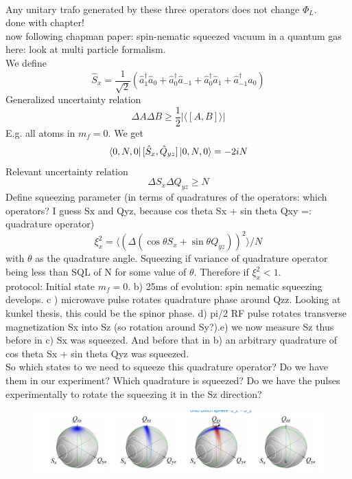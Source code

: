 \\
Any unitary trafo generated by these three operators does not change $\Phi_L$.
\\
done with chapter!
\\
now following chapman paper: spin-nematic squeezed vacuum in a quantum gas
\\
here: look at multi particle formalism.
\\
We define
\begin{equation}
	\hat{S}_x = \frac{1}{\sqrt{2}}( \hat{a}_1^\dag \hat{a}_0 + \hat{a}_0^\dag \hat{a}_{-1} + \hat{a}_0^\dag \hat{a}_1 + \hat{a}_{-1}^\dag \hat{a}_0)
\end{equation}
Generalized uncertainty relation
\begin{equation}
	\Delta A \Delta B \geq \frac{1}{2} |\langle [A,B] \rangle |
\end{equation}
E.g. all atoms in $m_f = 0$. We get 
\begin{equation}
	\bra{0,N,0} [\hat{S}_x , \hat{Q}_{yz} ] \ket{0,N,0} = - 2iN
\end{equation}
Relevant uncertainty relation
\begin{equation}
	\Delta S_x \Delta Q_{yz} \geq N
\end{equation}
Define squeezing parameter (in terms of quadratures of the operators: which operators? I guess Sx and Qyz, because cos theta Sx + sin theta Qxy =: quadrature operator)
\begin{equation}
	\xi_{x}^2 = \langle ( \Delta (\cos \theta S_{x} + \sin \theta Q_{yz}))^2 \rangle /N
\end{equation}
with $\theta$ as the quadrature angle. Squeezing if variance of quadrature operator being less than SQL of N for some value of $\theta$. 
Therefore if $\xi_x^2 < 1$.
\\
protocol: Initial state $m_f = 0$. b) 25ms of evolution: spin nematic squeezing develops. c ) microwave pulse rotates quadrature phase around Qzz. Looking at kunkel thesis, this could be the spinor phase.  d) pi/2 RF pulse rotates transverse magnetization Sx into Sz (so rotation around Sy?).e) we now measure Sz thus before in c) Sx was squeezed. And before that in b) an arbitrary quadrature of cos theta Sx + sin theta Qyz was squeezed. 
\\
So which states to we need to squeeze this quadrature operator? Do we have them in our experiment? Which quadrature is squeezed? Do we have the pulses experimentally to rotate the squeezing it in the Sz direction?
\begin{figure}
	\centering
	\includegraphics[width=0.7\linewidth]{chapman_fig1}
	\caption{}
	\label{fig:chapmanfig1}
\end{figure}










 



